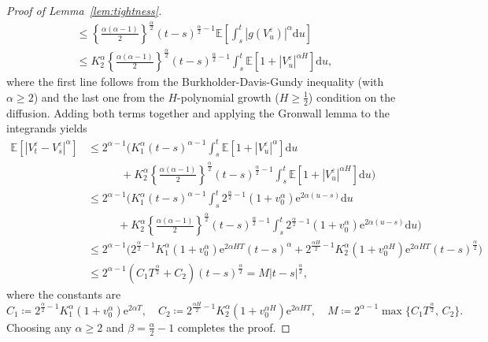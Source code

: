 \documentclass{amsart}[11pt]
\numberwithin{equation}{section}
\numberwithin{theorem}{subsection}
\numberwithin{proposition}{subsection}
\numberwithin{definition}{subsection}
\numberwithin{lemma}{subsection}
\numberwithin{assumption}{subsection}
\newcommand{\EE}{\mathbb{E}}
\newcommand{\D}{\mathrm{d}}
\newcommand{\E}{\mathrm{e}}
\newcommand{\eps}{\varepsilon}
\newcommand{\half}{\frac{1}{2}}
\begin{document}
\begin{proof}[Proof of Lemma~\ref{lem:tightness}]
\begin{align*}
&\leq \left\{\frac{\alpha(\alpha-1)}{2}\right\}^{\frac{\alpha}{2}} (t-s)^{\frac{\alpha}{2}-1} \EE\left[\int_s^t \left\vert g(V_u ^\eps)\right\vert^{\alpha} \D u  \right] & %
\\
&\leq K_2^\alpha \left\{\frac{\alpha(\alpha-1)}{2}\right\}^{\frac{\alpha}{2}} (t-s)^{\frac{\alpha}{2}-1} \int_s^t \EE\left[1 +  \left\vert V_u^\eps\right\vert^{\alpha H} \right] \D u,
\end{align*}
where the first line follows from the Burkholder-Davis-Gundy inequality (with $\alpha\geq 2$) and the last one from the 
$H$-polynomial growth ($H\geq \half$) condition on the diffusion. 
Adding both terms together and applying the Gronwall lemma to the integrands yields
\begin{align*}
\EE\left[\left\vert V_t^\eps - V_s^\eps\right\vert^\alpha\right] 
&\leq 2^{\alpha-1}\Big(K_1^\alpha(t-s)^{\alpha-1}\int_s^t \EE\left[ 1 + \left| V_u^\eps\right|^\alpha \right]\D u \\ 
& \quad \quad \quad + K_2^\alpha \left\{\frac{\alpha(\alpha-1)}{2}\right\}^{\frac{\alpha}{2}} (t-s)^{\frac{\alpha}{2}-1} \int_s^t \EE\left[1 +  \left| V_u^\eps\right|^{\alpha H} \right] \D u\Big)\\
&\leq 2^{\alpha-1}\Big(K_1^\alpha(t-s)^{\alpha-1}\int_s^t 2^{\frac{\alpha}{2}-1}(1 + v_0^\alpha)\E^{2\alpha(u-s)} \D u \\ & ~\quad \quad \:\; + K_2^\alpha \left\{\frac{\alpha(\alpha-1)}{2}\right\}^{\frac{\alpha}{2}} (t-s)^{\frac{\alpha}{2}-1} \int_s^t 2^{\frac{\alpha}{2}-1}(1 + v_0^\alpha)\E^{2\alpha(u-s)} \D u\Big)\\
&\leq 2^{\alpha-1} \Big(2^{\frac{\alpha}{2}-1} K_1^{\alpha} (1+v_0^\alpha)\E^{2\alpha H T} (t-s)^\alpha +  2^{\frac{\alpha H}{2}-1} K_2^{\alpha} (1+v_0^{\alpha H})\E^{2\alpha H T} (t-s)^{\frac{\alpha}{2}} \Big) \\
&\leq 2^{\alpha-1}\left(C_1 T^{\frac{\alpha}{2}} + C_2\right)(t-s)^{\frac{\alpha}{2}}
= M \left\vert t - s\right\vert^{\frac{\alpha}{2}},
\end{align*}
where the constants are 
$$
C_1\coloneqq 2^{\frac{\alpha}{2}-1} K_1^{\alpha} (1+v_0^\alpha)\E^{2\alpha T},
\quad
C_2\coloneqq 2^{\frac{\alpha H}{2}-1} K_2^{\alpha} (1+v_0^{\alpha H})\E^{2\alpha H T},
\quad
M\coloneqq 2^{\alpha-1}\max\{C_1 T^{\frac{\alpha}{2}}, \, C_2\}.
$$
Choosing any $\alpha\geq 2$ and $\beta = \frac{\alpha}{2}-1$ completes the proof.
\end{proof}
\end{document}
